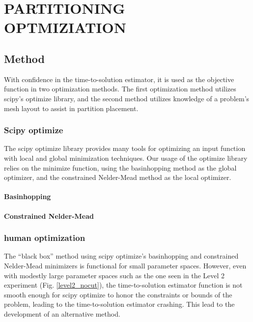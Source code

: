 %
%
%
%



\chapter{PARTITIONING OPTMIZIATION \label{cha:optimization}}
\section{Method}
With confidence in the time-to-solution estimator, it is used as the objective function in two optimization methods. The first optimization method utilizes scipy's optimize library, and the second method utilizes knowledge of a problem's mesh layout to assist in partition placement.
\subsection{Scipy optimize}
  The scipy optimize library \cite{scipy} provides many tools for optimizing an input function with local and global minimization techniques. Our usage of the optimize library relies on the minimize function, using the basinhopping method as the global optimizer, and the constrained Nelder-Mead method as the local optimizer.
  
\subsubsection{Basinhopping\cite{basinhoppingwales}}
  
\subsubsection{Constrained Nelder-Mead}
  
\subsection{human optimization}
  
  The ``black box'' method using scipy optimize's basinhopping and constrained Nelder-Mead minimizers is functional for small parameter spaces. However, even with modestly large parameter spaces such as the one seen in the Level 2 experiment (Fig. \ref{level2_nocut}), the time-to-solution estimator function is not smooth enough for scipy optimize to honor the constraints or bounds of the problem, leading to the time-to-solution estimator crashing. This lead to the development of an alternative method.  

